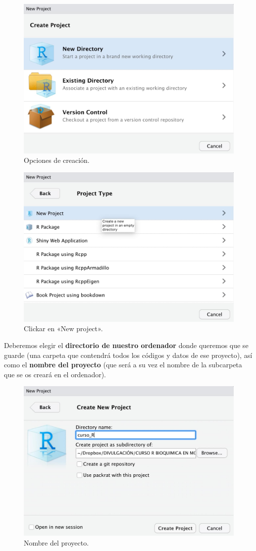 \documentclass[11pt,]{book}
\begin{document}
\begin{figure}

{\centering \includegraphics[width=0.5\linewidth]{./img/crear_proyecto2} 

}

\caption{Opciones de creación.}\label{fig:crear-proyecto2}
\end{figure}

\begin{figure}

{\centering \includegraphics[width=0.5\linewidth]{./img/crear_proyecto3} 

}

\caption{Clickar en «New project».}\label{fig:crear-proyecto3}
\end{figure}

Deberemos elegir el \textbf{directorio de nuestro ordenador} donde queremos que se guarde (una carpeta que contendrá todos los códigos y datos de ese proyecto), así como el \textbf{nombre del proyecto} (que será a su vez el nombre de la subcarpeta que se os creará en el ordenador).

\begin{figure}

{\centering \includegraphics[width=0.5\linewidth]{./img/crear_proyecto4} 

}

\caption{Nombre del proyecto.}\label{fig:crear-proyecto4}
\end{figure}
\end{document}
